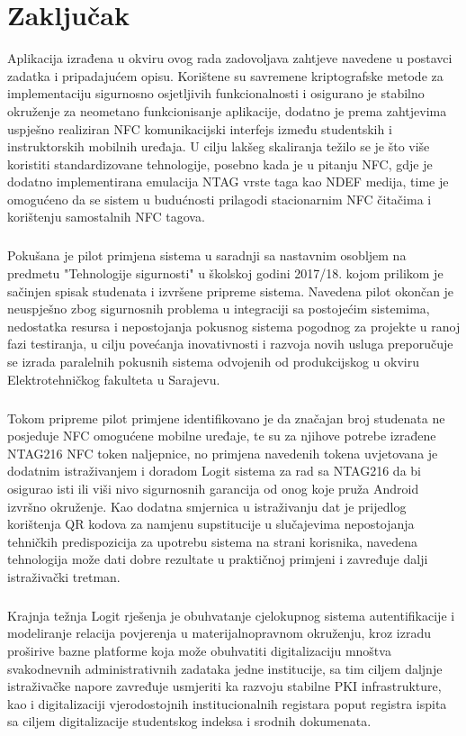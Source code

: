 \chapter{Zaključak}
Aplikacija izrađena u okviru ovog rada zadovoljava zahtjeve navedene u postavci zadatka i pripadajućem opisu. Korištene su savremene kriptografske metode za implementaciju sigurnosno osjetljivih funkcionalnosti i osigurano je stabilno okruženje za neometano funkcionisanje aplikacije, dodatno je prema zahtjevima uspješno realiziran NFC komunikacijski interfejs između studentskih i instruktorskih mobilnih uređaja. U cilju lakšeg skaliranja težilo se je što više koristiti standardizovane tehnologije, posebno kada je u pitanju NFC, gdje je dodatno implementirana emulacija NTAG vrste taga kao NDEF medija, time je omogućeno da se sistem u budućnosti prilagodi stacionarnim NFC čitačima i korištenju samostalnih NFC tagova.

\paragraph*{}
Pokušana je pilot primjena sistema u saradnji sa nastavnim osobljem na predmetu "Tehnologije sigurnosti" u školskoj godini 2017/18. kojom prilikom je sačinjen spisak studenata i izvršene pripreme sistema. Navedena pilot okončan je neuspješno zbog sigurnosnih problema u integraciji sa postojećim sistemima, nedostatka resursa i nepostojanja pokusnog sistema pogodnog za projekte u ranoj fazi testiranja, u cilju povećanja inovativnosti i razvoja novih usluga preporučuje se izrada paralelnih pokusnih sistema odvojenih od produkcijskog u okviru Elektrotehničkog fakulteta u Sarajevu.

\paragraph*{}
Tokom pripreme pilot primjene identifikovano je da značajan broj studenata ne posjeduje NFC omogućene mobilne uređaje, te su za njihove potrebe izrađene NTAG216 NFC token naljepnice, no primjena navedenih tokena uvjetovana je dodatnim istraživanjem i doradom Logit sistema za rad sa NTAG216 da bi osigurao isti ili viši nivo sigurnosnih garancija od onog koje pruža Android izvršno okruženje. Kao dodatna smjernica u istraživanju dat je prijedlog korištenja QR kodova za namjenu supstitucije u slučajevima nepostojanja tehničkih predispozicija za upotrebu sistema na strani korisnika, navedena tehnologija može dati dobre rezultate u praktičnoj primjeni i zavređuje dalji istraživački tretman.

\paragraph*{}
Krajnja težnja Logit rješenja je obuhvatanje cjelokupnog sistema autentifikacije i modeliranje relacija povjerenja u materijalnopravnom okruženju, kroz izradu proširive bazne platforme koja može obuhvatiti digitalizaciju mnoštva svakodnevnih administrativnih zadataka jedne institucije, sa tim ciljem daljnje istraživačke napore zavređuje usmjeriti ka razvoju stabilne PKI infrastrukture, kao i digitalizaciji vjerodostojnih institucionalnih registara poput registra ispita sa ciljem digitalizacije studentskog indeksa i srodnih dokumenata.
